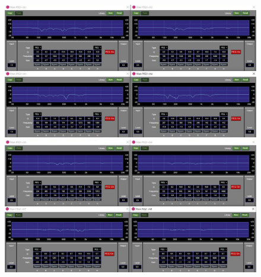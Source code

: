\documentclass[11pt,a4j]{jreport}
\begin{document}
\begin{figure}[H]
  \begin{minipage}[b]{.5\linewidth}
    \centering
    \includegraphics[width=.9\linewidth]{images/experimentField/afcParameters/02beta/03autoEQ1.jpg}
  \end{minipage}%
  \begin{minipage}[b]{.5\linewidth}
    \centering
    \includegraphics[width=.9\linewidth]{images/experimentField/afcParameters/02beta/03autoEQ2.jpg}
  \end{minipage}


\end{figure}
\end{document}
